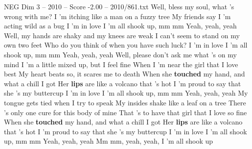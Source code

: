 \begin{textsample}{NEG Dim 3 – 2010 – Score -2.00 – 2010/861.txt}  \label{ex:f3_neg_028}
Well, bless my soul, what 's wrong with me?
I 'm itching like a man on a fuzzy tree My friends say I 'm acting wild as a bug I 'm in love I 'm all shook up, mm mm Yeah, yeah, yeah Well, my hands are shaky and my knees are weak I can't seem to stand on my own two feet Who do you think of when you have such luck?
I 'm in love I 'm all shook up, mm mm Yeah, yeah, yeah Well, please don't ask me what 's on my mind I 'm a little mixed up, but I feel fine When I 'm near the girl that I love best My heart beats so, it scares me to death When she \textbf{touched} my hand, and what a chill I got Her \textbf{lips} are like a volcano that 's hot I 'm proud to say that she 's my buttercup I 'm in love I 'm all shook up, mm mm Yeah, yeah, yeah My tongue gets tied when I try to speak My insides shake like a leaf on a tree There 's only one cure for this body of mine That 's to have that girl that I love so fine When she \textbf{touched} my hand, and what a chill I got Her \textbf{lips} are like a volcano that 's hot I 'm proud to say that she 's my buttercup I 'm in love I 'm all shook up, mm mm Yeah, yeah, yeah Mm mm, yeah, yeah, I 'm all shook up

\end{textsample}
